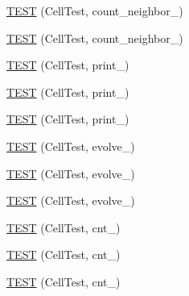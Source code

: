 \begin{DoxyCompactItemize}
\item 
\hyperlink{TestLife_8c_09_09_a472e2ccc8155de18130533d06690799a}{T\-E\-S\-T} (Cell\-Test, count\-\_\-neighbor\-\_)
\item 
\hyperlink{TestLife_8c_09_09_a297983df1b739c5875e51f9106d67691}{T\-E\-S\-T} (Cell\-Test, count\-\_\-neighbor\-\_)
\item 
\hyperlink{TestLife_8c_09_09_aa23bfc06d92664f3950bb98cdffc4104}{T\-E\-S\-T} (Cell\-Test, print\-\_)
\item 
\hyperlink{TestLife_8c_09_09_a53b7c460cac208b4ca50f70342932745}{T\-E\-S\-T} (Cell\-Test, print\-\_)
\item 
\hyperlink{TestLife_8c_09_09_a89f230ead84bbf84f2cf728f0c5a1b2e}{T\-E\-S\-T} (Cell\-Test, print\-\_)
\item 
\hyperlink{TestLife_8c_09_09_aa9c5d7bfbd5b6abfc1a8d35740ce0643}{T\-E\-S\-T} (Cell\-Test, evolve\-\_)
\item 
\hyperlink{TestLife_8c_09_09_a0aa7c3249d3cd5e6adf96763da9596a3}{T\-E\-S\-T} (Cell\-Test, evolve\-\_)
\item 
\hyperlink{TestLife_8c_09_09_ae3b0adf026a0f4c9beae4933f160574b}{T\-E\-S\-T} (Cell\-Test, evolve\-\_)
\item 
\hyperlink{TestLife_8c_09_09_aa999ddcaaacab5d67f8e7017f9b82770}{T\-E\-S\-T} (Cell\-Test, cnt\-\_)
\item 
\hyperlink{TestLife_8c_09_09_a7d67bcef2a5461bd46166dfa409f7b8c}{T\-E\-S\-T} (Cell\-Test, cnt\-\_)
\item 
\hyperlink{TestLife_8c_09_09_a0b506948b11b26e66fadde73f92df884}{T\-E\-S\-T} (Cell\-Test, cnt\-\_)
\end{DoxyCompactItemize}


